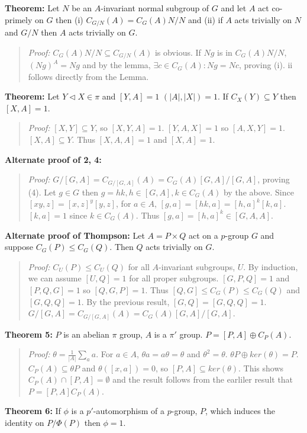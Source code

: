 {\bf  Theorem:} Let $N$ be an $A$-invariant normal subgroup of $G$ and
let $A$ act co-primely on $G$ then (i)
$C_{G/N}(A)= C_G(A)N/N$ and
(ii) if $A$ acts trivially on $N$ and $G/N$ then $A$ acts trivially on $G$.
\begin{quote}
\emph{Proof:}  $C_G(A)N/N \subseteq C_{G/N}(A) $ is obvious.
If $Ng$ is in $C_G(A)N/N$, $(Ng)^A=Ng$ and by
the lemma, $\exists c \in C_G(A): Ng=Nc$, proving (i).  ii follows directly from the Lemma.
\end{quote}
{\bf Theorem:} Let $Y \lhd X \in \pi$ and $[Y,A]=1$ $(|A|, |X|) = 1$.  If $C_X(Y) \subseteq Y$ then $[X,A]=1$.
\begin{quote}
\emph{Proof:}
$[X, Y] \subseteq Y$, so $[X, Y, A] = 1$.  $[Y, A, X] =1$ so $[A, X, Y] = 1$.
$[X, A] \subseteq Y$.  Thus $[X,A,A]=1$ and $[X,A]=1$.
\end{quote}
{\bf Alternate proof of 2, 4:}
\begin{quote}
\emph{Proof:}
$G/[G,A] = C_{G/[G,A]}(A) = C_G(A)[G,A]/[G,A]$, proving (4).  Let $g \in G$ then $g = hk, h \in [G,A], k \in C_G(A)$ by the above. Since $[xy, z]= [x,z]^y [y,z]$, for $a \in A$,
$[g,a]= [hk,a] = [h,a]^k [k,a]$.  $[k,a]=1$ since $k \in C_G(A)$.  Thus
$[g,a] = [h,a]^k \in [G,A,A]$.
\end{quote}
{\bf Alternate proof of Thompson:}  Let $A= P \times Q$ act on a $p$-group $G$ and suppose $C_G(P) \leq C_G(Q)$.  Then
$Q$ acts trivially on $G$.
\begin{quote}
\emph{Proof:}  $C_U(P) \leq C_U(Q)$ for all $A$-invariant subgroups, $U$.  By induction, we can assume
$[U,Q]=1$ for all proper subgroups.  $[G,P,Q]=1$ and $[P, Q, G] =1$ so $[Q, G, P]=1$.  Thus
$[Q,G] \leq C_G(P) \leq C_G(Q)$ and $[G,Q,Q] = 1$.  By the previous result, $[G,Q]=[G,Q,Q]=1$.
$G/[G,A] = C_{G/[G,A]}(A) = C_G(A)[G,A]/[G,A]$.  \end{quote}
{\bf Theorem 5:} $P$ is an abelian $\pi$ group, $A$ is a $\pi'$ group.  $P= [P,A] \oplus C_P(A)$.
\begin{quote}
\emph{Proof:}
$\theta= {\frac 1 {|A|}} \sum_a a$.  For $a \in A$, $\theta a = a \theta = \theta$ and
$\theta^2= \theta$. $\theta P \oplus ker(\theta)= P$.  $C_P(A) \subseteq \theta P$ and
$\theta([x,a]) =0$, so $[P,A] \subseteq ker(\theta)$.  This shows $C_P(A) \cap [P,A] = \emptyset$
and the result follows from the earliler result that $P= [P,A] C_P(A)$.
\end{quote}
{\bf Theorem 6:}
If $\phi$ is a $p'$-automorphism of a $p$-group, $P$, which induces the identity on
$P/ \Phi(P)$ then $\phi= 1$.
